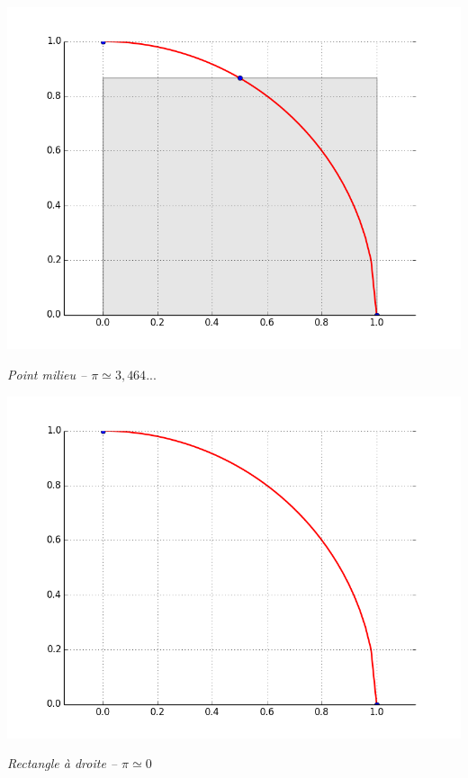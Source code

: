 \documentclass[10pt,fleqn]{article} %
\begin{document}
\begin{minipage}[c]{.24\linewidth}
\begin{center}
\includegraphics[width=.99\textwidth]{images/CourbesPython/pi_rect_m_1}

\textit{Point milieu -- $\pi \simeq 3,464...$}
\end{center}
\end{minipage}\hfill
\begin{minipage}[c]{.24\linewidth}
\begin{center}
\includegraphics[width=.99\textwidth]{images/CourbesPython/pi_rect_d_1}

\textit{Rectangle à droite -- $\pi \simeq 0$}
\end{center}
\end{minipage}
\end{document}
